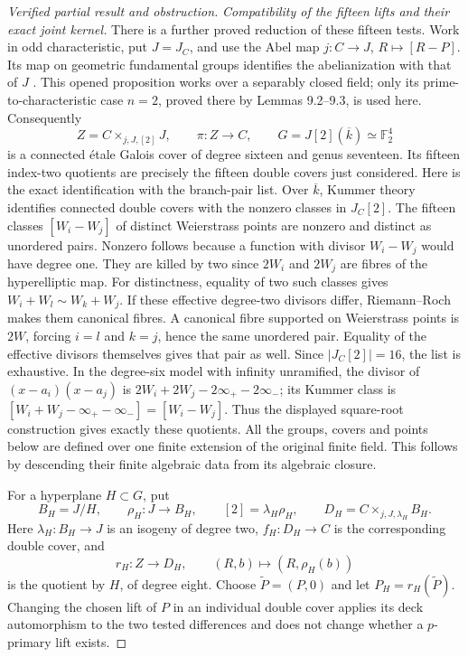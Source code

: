 \begin{proof}[Verified partial result and obstruction]
\emph{Compatibility of the fifteen lifts and their exact joint kernel.}
There is a further proved reduction of these fifteen tests. Work in
odd characteristic, put $J=J_C$, and use the Abel map
$j:C\to J$, $R\mapsto[R-P]$. Its map on geometric fundamental
groups identifies the abelianization with that of $J$
\cite[III, Proposition 9.1]{AB_MilneAV}. This opened proposition
works over a separably closed field; only its prime-to-characteristic
case $n=2$, proved there by Lemmas 9.2--9.3, is used here.
Consequently
\[
 Z=C\times_{j,J,[2]}J,\qquad \pi:Z\longrightarrow C,
 \qquad G=J[2](\overline k)\simeq\mathbb F_2^4
\]
is a connected \'etale Galois cover of degree sixteen and genus
seventeen. Its fifteen index-two quotients are precisely the
fifteen double covers just considered. Here is the exact
identification with the branch-pair list. Over $\overline k$,
Kummer theory identifies connected double covers with the nonzero
classes in $J_C[2]$\cite[III, Lemma 9.2]{AB_MilneAV}.
The fifteen classes $[W_i-W_j]$ of distinct Weierstrass points
are nonzero and distinct as unordered pairs. Nonzero follows
because a function with divisor $W_i-W_j$ would have degree one.
They are killed by two since $2W_i$ and $2W_j$ are fibres of
the hyperelliptic map. For distinctness, equality of two such
classes gives $W_i+W_l\sim W_k+W_j$. If these effective
degree-two divisors differ, Riemann--Roch makes them canonical
fibres. A canonical fibre supported on Weierstrass points is
$2W$, forcing $i=l$ and $k=j$, hence the same unordered pair.
Equality of the effective divisors themselves gives that pair
as well. Since $|J_C[2]|=16$, the list is exhaustive.
In the degree-six model with infinity unramified, the divisor
of $(x-a_i)(x-a_j)$ is
$2W_i+2W_j-2\infty_+-2\infty_-$; its Kummer class is
$[W_i+W_j-\infty_+-\infty_-]=[W_i-W_j]$.
Thus the displayed square-root construction gives exactly these
quotients. All the groups, covers and
points below are defined over one finite extension of the original
finite field. This follows by descending their finite algebraic
data from its algebraic closure.

For a hyperplane $H\subset G$, put
\[
 B_H=J/H,\qquad \rho_H:J\to B_H,\qquad
 [2]=\lambda_H\rho_H,\qquad
 D_H=C\times_{j,J,\lambda_H}B_H.
\]
Here $\lambda_H:B_H\to J$ is an isogeny of degree two,
$f_H:D_H\to C$ is the corresponding double cover, and
\[
 r_H:Z\longrightarrow D_H,
 \qquad (R,b)\longmapsto(R,\rho_H(b))
\]
is the quotient by $H$, of degree eight. Choose
$\widetilde P=(P,0)$ and let $P_H=r_H(\widetilde P)$.
Changing the chosen lift of $P$ in an individual double cover
applies its deck automorphism to the two tested differences and
does not change whether a $p$-primary lift exists.


\end{proof}
